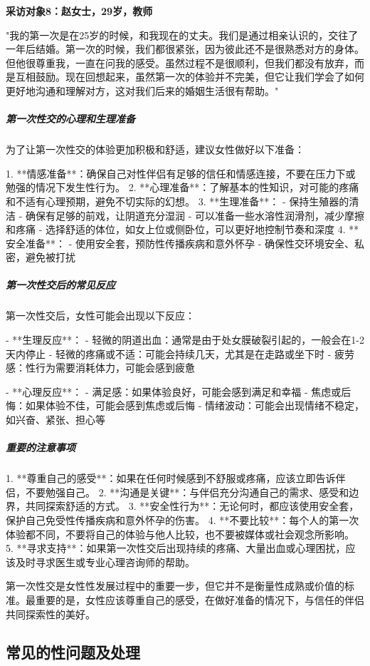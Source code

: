 \begin{enumerate}
\textbf{采访对象8：赵女士，29岁，教师}

"我的第一次是在25岁的时候，和我现在的丈夫。我们是通过相亲认识的，交往了一年后结婚。第一次的时候，我们都很紧张，因为彼此还不是很熟悉对方的身体。但他很尊重我，一直在问我的感受。虽然过程不是很顺利，但我们都没有放弃，而是互相鼓励。现在回想起来，虽然第一次的体验并不完美，但它让我们学会了如何更好地沟通和理解对方，这对我们后来的婚姻生活很有帮助。" 

\subparagraph{第一次性交的心理和生理准备}

为了让第一次性交的体验更加积极和舒适，建议女性做好以下准备：

1. **情感准备**：确保自己对性伴侣有足够的信任和情感连接，不要在压力下或勉强的情况下发生性行为。
2. **心理准备**：了解基本的性知识，对可能的疼痛和不适有心理预期，避免不切实际的幻想。
3. **生理准备**：
   - 保持生殖器的清洁
   - 确保有足够的前戏，让阴道充分湿润
   - 可以准备一些水溶性润滑剂，减少摩擦和疼痛
   - 选择舒适的体位，如女上位或侧卧位，可以更好地控制节奏和深度
4. **安全准备**：
   - 使用安全套，预防性传播疾病和意外怀孕
   - 确保性交环境安全、私密，避免被打扰

\subparagraph{第一次性交后的常见反应}

第一次性交后，女性可能会出现以下反应：

- **生理反应**：
  - 轻微的阴道出血：通常是由于处女膜破裂引起的，一般会在1-2天内停止
  - 轻微的疼痛或不适：可能会持续几天，尤其是在走路或坐下时
  - 疲劳感：性行为需要消耗体力，可能会感到疲惫

- **心理反应**：
  - 满足感：如果体验良好，可能会感到满足和幸福
  - 焦虑或后悔：如果体验不佳，可能会感到焦虑或后悔
  - 情绪波动：可能会出现情绪不稳定，如兴奋、紧张、担心等

\subparagraph{重要的注意事项}

1. **尊重自己的感受**：如果在任何时候感到不舒服或疼痛，应该立即告诉伴侣，不要勉强自己。
2. **沟通是关键**：与伴侣充分沟通自己的需求、感受和边界，共同探索舒适的方式。
3. **安全性行为**：无论何时，都应该使用安全套，保护自己免受性传播疾病和意外怀孕的伤害。
4. **不要比较**：每个人的第一次体验都不同，不要将自己的体验与他人比较，也不要被媒体或社会观念所影响。
5. **寻求支持**：如果第一次性交后出现持续的疼痛、大量出血或心理困扰，应该及时寻求医生或专业心理咨询师的帮助。

第一次性交是女性性发展过程中的重要一步，但它并不是衡量性成熟或价值的标准。最重要的是，女性应该尊重自己的感受，在做好准备的情况下，与信任的伴侣共同探索性的美好。

\subsection{常见的性问题及处理}


\end{enumerate}
